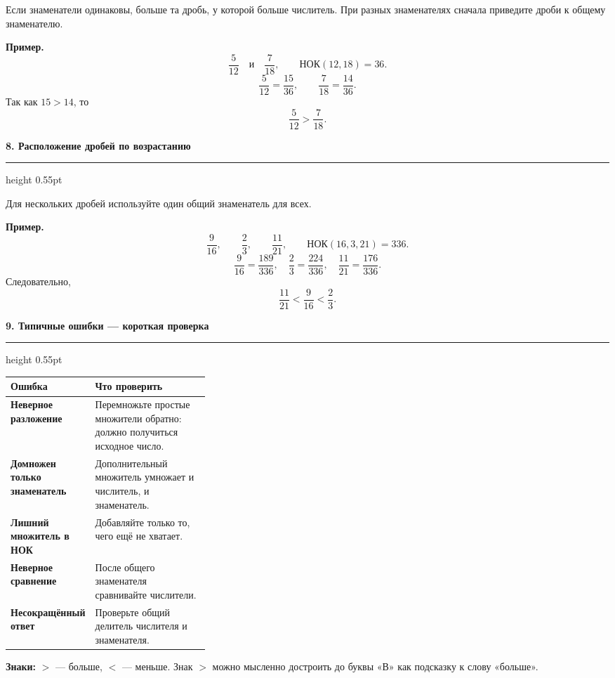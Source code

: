 \documentclass[a4paper,12pt]{article}
\newcommand{\sectiontitle}[1]{%
  \vspace{0.2em}%
  {\large\bfseries\color{darkaccent}#1}\par
  \vspace{0.08em}\hrule height 0.55pt\vspace{0.42em}%
}
\begin{document}
Если знаменатели одинаковы, больше та дробь, у которой больше числитель. При разных знаменателях сначала приведите дроби к общему знаменателю.

\textbf{Пример.}
\[
\frac5{12}\quad\text{и}\quad\frac7{18},
\qquad \text{НОК}(12,18)=36.
\]
\[
\frac5{12}=\frac{15}{36},\qquad
\frac7{18}=\frac{14}{36}.
\]
Так как $15>14$, то
\[
\boxed{\frac5{12}>\frac7{18}}.
\]

\sectiontitle{8. Расположение дробей по возрастанию}

Для нескольких дробей используйте один общий знаменатель для всех.

\textbf{Пример.}
\[
\frac9{16},\qquad \frac23,\qquad \frac{11}{21},
\qquad \text{НОК}(16,3,21)=336.
\]
\[
\frac9{16}=\frac{189}{336},\quad
\frac23=\frac{224}{336},\quad
\frac{11}{21}=\frac{176}{336}.
\]
Следовательно,
\[
\boxed{\frac{11}{21}<\frac9{16}<\frac23}.
\]

\sectiontitle{9. Типичные ошибки — короткая проверка}

\begin{tabularx}{\linewidth}{@{}>{\bfseries}p{0.33\linewidth}X@{}}
\toprule
Ошибка & Что проверить \\
\midrule
Неверное разложение & Перемножьте простые множители обратно: должно получиться исходное число. \\
Домножен только знаменатель & Дополнительный множитель умножает и числитель, и знаменатель. \\
Лишний множитель в НОК & Добавляйте только то, чего ещё не хватает. \\
Неверное сравнение & После общего знаменателя сравнивайте числители. \\
Несокращённый ответ & Проверьте общий делитель числителя и знаменателя. \\
\bottomrule
\end{tabularx}

\vspace{0.35em}
\textbf{Знаки:} $>$ — больше, $<$ — меньше. Знак $>$ можно мысленно достроить до буквы «В» как подсказку к слову «больше».

\clearpage
\end{document}
